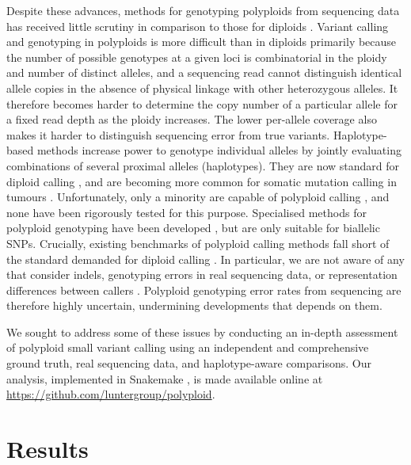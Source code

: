 \documentclass[notitlepage, twocolumn, 10pt]{article}
\begin{document}
Despite these advances, methods for genotyping polyploids from sequencing data has received little scrutiny in comparison to those for diploids \cite{RN677, RN651, RN605, RN675}. Variant calling and genotyping in polyploids is more difficult than in diploids primarily because the number of possible genotypes at a given loci is combinatorial in the ploidy and number of distinct alleles, and a sequencing read cannot distinguish identical allele copies in the absence of physical linkage with other heterozygous alleles. It therefore becomes harder to determine the copy number of a particular allele for a fixed read depth as the ploidy increases. The lower per-allele coverage also makes it harder to distinguish sequencing error from true variants. Haplotype-based methods increase  power to genotype individual alleles by jointly evaluating combinations of several proximal alleles (haplotypes). They are now standard for diploid calling \cite{RN844, RN598, RN538, RN604, RN619, RN5}, and are becoming more common for somatic mutation calling in tumours \cite{RN844}. Unfortunately, only a minority are capable of polyploid calling \cite{RN844, RN598, RN538}, and none have been rigorously tested for this purpose. Specialised methods for polyploid genotyping have been developed \cite{RN666, RN662, RN674}, but are only suitable for biallelic SNPs. Crucially, existing benchmarks of polyploid calling methods fall short of the standard demanded for diploid calling \cite{RN678, RN655, RN656, RN675}. In particular, we are not aware of any that consider indels, genotyping errors in real sequencing data, or representation differences between callers \cite{RN675}. Polyploid genotyping error rates from sequencing are therefore highly uncertain, undermining developments that depends on them.

We sought to address some of these issues by conducting an in-depth assessment of polyploid small variant calling using an independent and comprehensive ground truth, real sequencing data, and haplotype-aware comparisons. Our analysis, implemented in Snakemake \cite{RN756}, is made available online at \url{https://github.com/luntergroup/polyploid}.

\section*{Results}
\end{document}
